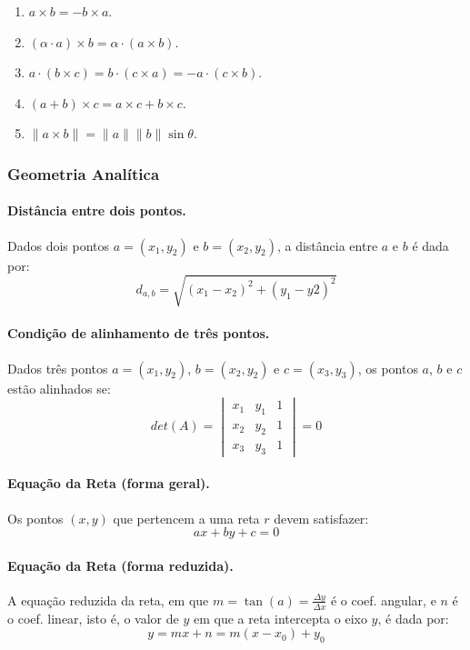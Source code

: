 \begin{enumerate}
	\item $a \times b = -b \times a$.
	\item $(\alpha \cdot a) \times b = \alpha \cdot (a \times b)$.
	\item $a \cdot (b \times c) = b\cdot (c \times a) = -a\cdot(c\times b)$.
	\item $(a+b)\times c = a\times c + b\times c$.
	\item $\|a \times b \| = \|a\|\|b\|\sin\theta$.
\end{enumerate}

\subsubsection{Geometria Analítica}
\paragraph{Distância entre dois pontos.} Dados dois pontos $a = (x_1,y_2)$ e $b = (x_2,y_2)$, a distância entre $a$ e $b$ é dada por:
		$$d_{a,b} = \sqrt{(x_1 - x_2)^2 + (y_1 - y2)^2}$$

\paragraph{Condição de alinhamento de três pontos.} Dados três pontos $a = (x_1,y_2)$, $b = (x_2,y_2)$ e $c = (x_3,y_3)$, os pontos $a$, $b$ e $c$ estão alinhados se:
		$$det(A) =
			\begin{vmatrix}
				x_1 & y_1 & 1 \\
				x_2 & y_2 & 1 \\
				x_3 & y_3 & 1
			\end{vmatrix} = 0 $$

\paragraph{Equação da Reta (forma geral).} Os pontos $(x,y)$ que pertencem a uma reta $r$ devem satisfazer:
		$$ax + by + c = 0$$

\paragraph{Equação da Reta (forma reduzida).} A equação reduzida da reta, em que $m = \tan(a) = \frac{\Delta y}{\Delta x}$ é o coef. angular, e $n$ é o coef. linear, isto é, o valor de $y$ em que a reta intercepta o eixo $y$, é dada por:
		$$y = mx + n = m(x - x_0) +y_0$$

